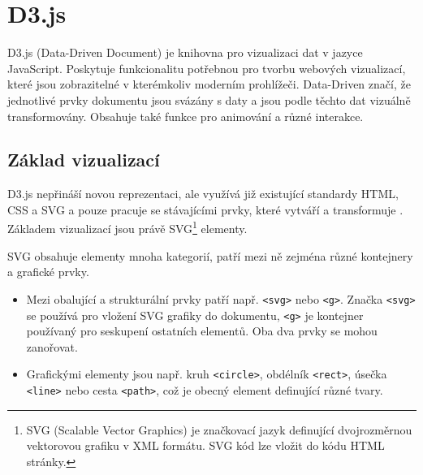 \documentclass[
  digital, %
  oneside, %
  table,   %
  nolof,     %
  nolot,     %
]{fithesis3}
\begin{document}
\section{D3.js}
D3.js (Data-Driven Document) je knihovna pro vizualizaci dat v jazyce JavaScript. Poskytuje funkcionalitu potřebnou pro tvorbu webových vizualizací, které jsou zobrazitelné v kterémkoliv moderním prohlížeči. Data-Driven značí, že jednotlivé prvky dokumentu jsou svázány s daty a jsou podle těchto dat vizuálně transformovány. Obsahuje také funkce pro animování a různé interakce.

\subsection{Základ vizualizací}
D3.js nepřináší novou reprezentaci, ale využívá již existující standardy HTML, CSS a SVG a pouze pracuje se stávajícími prvky, které vytváří a transformuje \cite{d3jsorg}. Základem vizualizací jsou právě SVG\footnote{SVG (Scalable Vector Graphics) je značkovací jazyk definující dvojrozměrnou vektorovou grafiku v XML formátu. SVG kód lze vložit do kódu HTML stránky.} elementy.\par
SVG obsahuje elementy mnoha kategorií, patří mezi ně zejména různé kontejnery a grafické prvky. \cite{svgMozillaorg}
\begin{itemize}
  \item Mezi obalující a strukturální prvky patří např. \verb|<svg>| nebo \verb|<g>|. Značka \verb|<svg>| se používá pro vložení SVG grafiky do dokumentu, \verb|<g>| je kontejner používaný pro seskupení ostatních elementů. Oba dva prvky se mohou zanořovat.
  \item Grafickými elementy jsou např. kruh \verb|<circle>|, obdélník \verb|<rect>|, úsečka \verb|<line>| nebo cesta \verb|<path>|, což je obecný element definující různé tvary.
\end{itemize}
\end{document}
